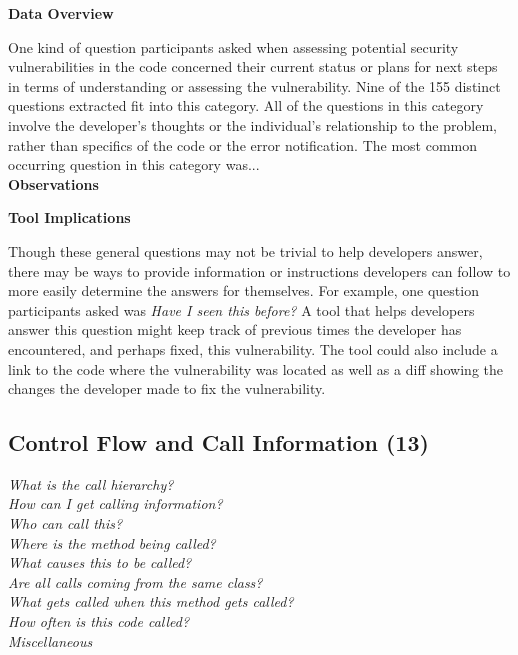 \documentclass[conference]{IEEEtran}
\begin{document}
\noindent\textbf{Data Overview}

One kind of question participants asked when assessing potential security vulnerabilities in the code concerned their current status or plans for next steps in terms of understanding or assessing the vulnerability. Nine of the 155 distinct questions extracted fit into this category. All of the questions in this category involve the developer's thoughts or the individual's relationship to the problem, rather than specifics of the code or the error notification.  The most common occurring question in this category was...
\\

\noindent\textbf{Observations}



\noindent\textbf{Tool Implications}

Though these general questions may not be trivial to help developers answer, there may be ways to provide information or instructions developers can follow to more easily determine the answers for themselves. 
For example, one question participants asked was \textit{Have I seen this before?}
A tool that helps developers answer this question might keep track of previous times the developer has encountered, and perhaps fixed, this vulnerability. 
The tool could also include a link to the code where the vulnerability was located as well as a diff showing the changes the developer made to fix the vulnerability.



\noindent\subsection{\textbf{Control Flow and Call Information (13)}}\label{cf}

\noindent\emph{What is the call hierarchy?} \\
\emph{How can I get calling information?} \\
\emph{Who can call this?} \\
\emph{Where is the method being called?} \\
\emph{What causes this to be called?} \\
\emph{Are all calls coming from the same class?} \\
\emph{What gets called when this method gets called?} \\
\emph{How often is this code called?} \\
\emph{Miscellaneous} \\
\end{document}
